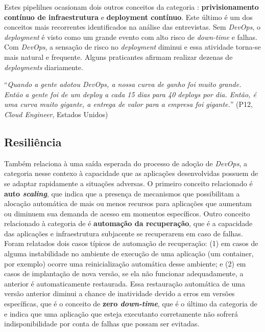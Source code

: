 Estes pipelilnes ocasionam dois outros conceitos da categoria :
{\bf privisionamento contínuo de infraestrutura} e {\bf deployment contínuo}.
Este último é um dos conceitos mais recorrentes identificados na análise das
entrevistas. Sem {\it DevOps}, o {\it deployment} é visto como um grande evento
com alto risco de {\it down-time} e falhas. Com {\it DevOps}, a sensação de
risco no {\it deployment} diminui e essa atividade torna-se mais natural e
frequente. Alguns praticantes afirmam realizar dezenas de {\it deployments}
diariamente.

\begin{mq}
``\emph{Quando a gente adotou DevOps, a nossa curva de ganho foi muito grande.
Então a gente foi de um deploy a cada 15 dias para 40 deploys por dia. Então,
é uma curva muito gigante, a entrega de valor para a empresa foi gigante.}''
(P12, {\it Cloud Engineer}, Estados Unidos)
\end{mq}

\subsection{Resiliência}

Também relaciona à uma saída esperada do processo de adoção de {\it DevOps}, a
categoria  nesse contexo à capacidade que as aplicações
desenvolvidas possuem de se adaptar rapidamente a situações adversas. O primeiro
conceito relacionado é {\bf auto \emph{scaling}}, que indica que a presença de
mecanismos que possibilitam a alocação automática de mais ou menos recursos para
aplicações que aumentam ou diminuem sua demanda de acesso em momentos
específicos. Outro conceito relacionado à categoria de  é
\textbf{automação da recuperação}, que é a capacidade das aplicações e
infraestrutura subjacente se recuperarem em caso de falhas. Foram relatados dois
casos típicos de automação de recuperação: (1) em casos de alguma instabilidade
no ambiente de execução de uma aplicação (um container, por exemplo) ocorre
uma reinicialização automática desse ambiente; e (2) em casos de implantação
de nova versão, se ela não funcionar adequadamente, a anterior é automaticamente
restaurada. Essa restauração automática de uma versão anterior diminui a chance
de inatividade devido a erros em versões específicas, que é o conceito de {\bf
zero \emph{down-time}}, que é o último da categoria de  e indica
que uma aplicação que esteja executanto corretamente não sofrerá
indisponibilidade por conta de falhas que possam ser evitadas.

